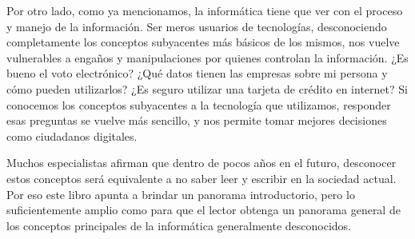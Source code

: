 Por otro lado, como ya mencionamos, la informática tiene que ver con el proceso
y manejo de la información. Ser meros usuarios de tecnologías, desconociendo
completamente los conceptos subyacentes más básicos de los mismos, nos vuelve
vulnerables a engaños y manipulaciones por quienes controlan la información.
¿Es bueno el voto electrónico? ¿Qué datos tienen las empresas sobre mi persona
y cómo pueden utilizarlos? ¿Es seguro utilizar una tarjeta de crédito en internet?
Si conocemos los conceptos subyacentes a la tecnología que utilizamos, responder
esas preguntas se vuelve más sencillo, y nos permite tomar mejores decisiones
como ciudadanos digitales.

Muchos especialistas afirman que dentro de pocos años en el futuro, desconocer
estos conceptos será equivalente a no saber leer y escribir en la sociedad
actual. Por eso este libro apunta a brindar un panorama introductorio, pero
lo suficientemente amplio como para que el lector obtenga un panorama
general de los conceptos principales de la informática generalmente
desconocidos.